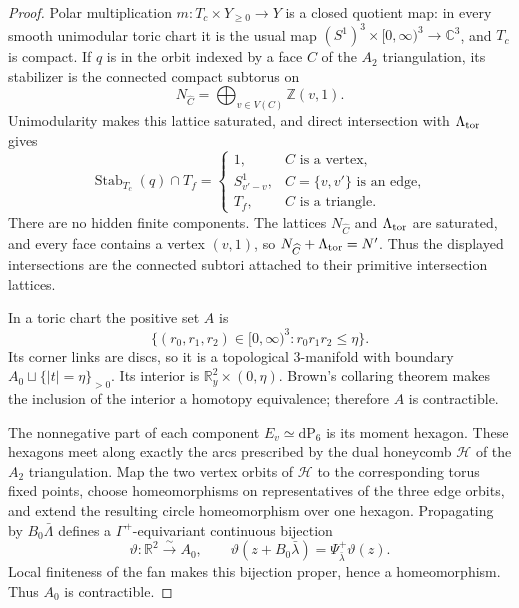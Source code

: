 \begin{proof}
Polar multiplication $m:T_c\times Y_{\geq0}\to Y$ is a closed quotient map:
in every smooth unimodular toric chart it is the usual map
$(S^1)^3\times[0,\infty)^3\to\mathbb C^3$, and $T_c$ is compact.  If $q$ is
in the orbit indexed by a face $C$ of the $A_2$ triangulation, its stabilizer
is the connected compact subtorus on
\[
 N_{\widehat C}=\bigoplus_{v\in V(C)}\mathbb Z(v,1).
\]
Unimodularity makes this lattice saturated, and direct intersection with
$\Lambda_{\rm tor}$ gives
\[
 \operatorname{Stab}_{T_c}(q)\cap T_f=
 \begin{cases}
  1,&C\text{ is a vertex},\\
  S^1_{v'-v},&C=\{v,v'\}\text{ is an edge},\\
  T_f,&C\text{ is a triangle}.
 \end{cases}
\tag{TM.C.7}
\]
There are no hidden finite components.  The lattices
$N_{\widehat C}$ and $\Lambda_{\rm tor}$ are saturated, and every face contains
a vertex $(v,1)$, so
$N_{\widehat C}+\Lambda_{\rm tor}=N'$.  Thus the displayed intersections are
the connected subtori attached to their primitive intersection lattices.

In a toric chart the positive set $A$ is
\[
 \{(r_0,r_1,r_2)\in[0,\infty)^3:r_0r_1r_2\leq\eta\}.
\]
Its corner links are discs, so it is a topological $3$-manifold with boundary
$A_0\sqcup\{|t|=\eta\}_{>0}$.  Its interior is
$\mathbb R_y^2\times(0,\eta)$.  Brown's collaring theorem
\cite{Brown1962} makes the inclusion of the interior a homotopy equivalence;
therefore $A$ is contractible.

The nonnegative part of each component $E_v\simeq\mathrm{dP}_6$ is its moment
hexagon.  These hexagons meet along exactly the arcs prescribed by the dual
honeycomb $\mathcal H$ of the $A_2$ triangulation.  Map the two vertex orbits
of $\mathcal H$ to the corresponding torus fixed points, choose homeomorphisms
on representatives of the three edge orbits, and extend the resulting circle
homeomorphism over one hexagon.  Propagating by $B_0\bar\Lambda$ defines a
$\Gamma^+$-equivariant continuous bijection
\[
 \vartheta:\mathbb R^2\xrightarrow{\sim}A_0,\qquad
 \vartheta(z+B_0\bar\lambda)=
 \Psi^+_{\bar\lambda}\vartheta(z).
\tag{TM.C.8}
\]
Local finiteness of the fan makes this bijection proper, hence a homeomorphism.
Thus $A_0$ is contractible.


\end{proof}

